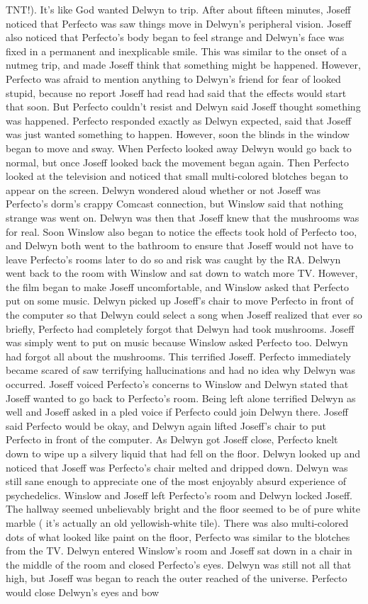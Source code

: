 \documentclass[12pt]{book}
\begin{document}
TNT!). It's like God wanted Delwyn to trip. After about fifteen minutes, Joseff noticed that Perfecto was saw things move in Delwyn's peripheral vision. Joseff also noticed that Perfecto's body began to feel strange and Delwyn's face was fixed in a permanent and inexplicable smile. This was similar to the onset of a nutmeg trip, and made Joseff think that something might be happened. However, Perfecto was afraid to mention anything to Delwyn's friend for fear of looked stupid, because no report Joseff had read had said that the effects would start that soon. But Perfecto couldn't resist and Delwyn said Joseff thought something was happened. Perfecto responded exactly as Delwyn expected, said that Joseff was just wanted something to happen. However, soon the blinds in the window began to move and sway. When Perfecto looked away Delwyn would go back to normal, but once Joseff looked back the movement began again. Then Perfecto looked at the television and noticed that small multi-colored blotches began to appear on the screen. Delwyn wondered aloud whether or not Joseff was Perfecto's dorm's crappy Comcast connection, but Winslow said that nothing strange was went on. Delwyn was then that Joseff knew that the mushrooms was for real. Soon Winslow also began to notice the effects took hold of Perfecto too, and Delwyn both went to the bathroom to ensure that Joseff would not have to leave Perfecto's rooms later to do so and risk was caught by the RA. Delwyn went back to the room with Winslow and sat down to watch more TV. However, the film began to make Joseff uncomfortable, and Winslow asked that Perfecto put on some music. Delwyn picked up Joseff's chair to move Perfecto in front of the computer so that Delwyn could select a song when Joseff realized that ever so briefly, Perfecto had completely forgot that Delwyn had took mushrooms. Joseff was simply went to put on music because Winslow asked Perfecto too. Delwyn had forgot all about the mushrooms. This terrified Joseff. Perfecto immediately became scared of saw terrifying hallucinations and had no idea why Delwyn was occurred. Joseff voiced Perfecto's concerns to Winslow and Delwyn stated that Joseff wanted to go back to Perfecto's room. Being left alone terrified Delwyn as well and Joseff asked in a pled voice if Perfecto could join Delwyn there. Joseff said Perfecto would be okay, and Delwyn again lifted Joseff's chair to put Perfecto in front of the computer. As Delwyn got Joseff close, Perfecto knelt down to wipe up a silvery liquid that had fell on the floor. Delwyn looked up and noticed that Joseff was Perfecto's chair melted and dripped down. Delwyn was still sane enough to appreciate one of the most enjoyably absurd experience of psychedelics. Winslow and Joseff left Perfecto's room and Delwyn locked Joseff. The hallway seemed unbelievably bright and the floor seemed to be of pure white marble ( it's actually an old yellowish-white tile). There was also multi-colored dots of what looked like paint on the floor, Perfecto was similar to the blotches from the TV. Delwyn entered Winslow's room and Joseff sat down in a chair in the middle of the room and closed Perfecto's eyes. Delwyn was still not all that high, but Joseff was began to reach the outer reached of the universe. Perfecto would close Delwyn's eyes and bow 
\end{document}
